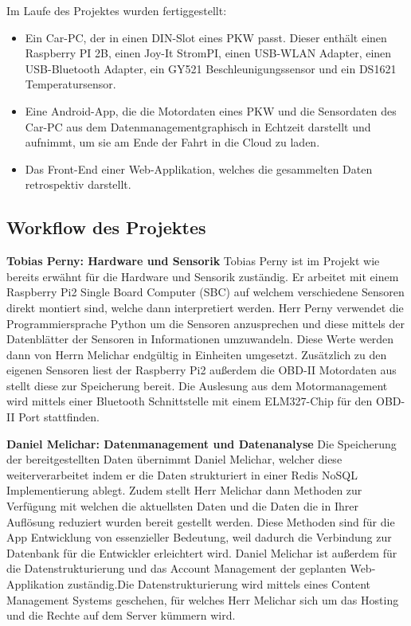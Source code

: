 Im Laufe des Projektes wurden fertiggestellt:
\begin{itemize}
\item Ein Car-PC, der in einen DIN-Slot eines PKW passt. Dieser enthält einen Raspberry PI 2B,
einen Joy-It StromPI,
einen USB-WLAN Adapter,
einen USB-Bluetooth Adapter,
ein GY521 Beschleunigungssensor und
ein DS1621 Temperatursensor.
\item Eine Android-App, die die Motordaten eines PKW und die Sensordaten des Car-PC aus dem Datenmanagementgraphisch in Echtzeit darstellt und aufnimmt, um sie am Ende der Fahrt in die Cloud zu laden.
\item Das Front-End einer Web-Applikation, welches die gesammelten Daten retrospektiv darstellt.
\end{itemize}

\subsection{Workflow des Projektes}
	\textbf{Tobias Perny: Hardware und Sensorik\newline}
	Tobias Perny ist im Projekt wie bereits erwähnt für die Hardware und Sensorik zuständig. Er arbeitet mit einem Raspberry Pi2 Single Board Computer (SBC) auf welchem verschiedene Sensoren direkt montiert sind, welche dann interpretiert werden. Herr Perny verwendet die Programmiersprache Python um die Sensoren anzusprechen und diese mittels der Datenblätter der Sensoren in Informationen umzuwandeln. Diese Werte werden dann von Herrn Melichar endgültig in Einheiten umgesetzt.
	Zusätzlich zu den eigenen Sensoren liest der Raspberry Pi2 außerdem die OBD-II Motordaten aus stellt diese zur Speicherung bereit. 
	Die Auslesung aus dem Motormanagement wird mittels einer Bluetooth Schnittstelle mit einem ELM327-Chip für den OBD-II Port stattfinden.

	\textbf{Daniel Melichar: Datenmanagement und Datenanalyse\newline}
	Die Speicherung der bereitgestellten Daten übernimmt Daniel Melichar, welcher diese weiterverarbeitet indem er die Daten strukturiert in einer Redis NoSQL Implementierung ablegt. Zudem stellt Herr Melichar dann Methoden zur Verfügung mit welchen die aktuellsten Daten und die Daten die in Ihrer Auflösung reduziert wurden bereit gestellt werden. Diese Methoden sind für die App Entwicklung von essenzieller Bedeutung, weil dadurch die Verbindung zur Datenbank für die Entwickler erleichtert wird.
	Daniel Melichar ist außerdem für die Datenstrukturierung und das Account Management der geplanten Web-Applikation zuständig.Die Datenstrukturierung wird mittels eines Content Management Systems geschehen, für welches Herr Melichar sich um das Hosting und die Rechte auf dem Server kümmern wird. 

